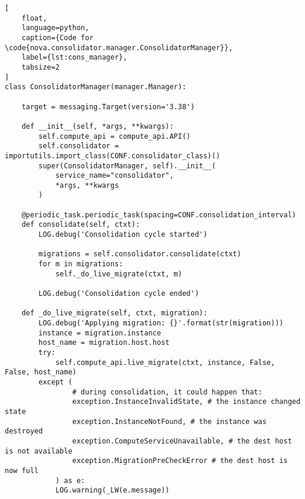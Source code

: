 \begin{lstlisting}[
	float,
	language=python,
	caption={Code for \code{nova.consolidator.manager.ConsolidatorManager}},
	label={lst:cons_manager},
	tabsize=2
]
class ConsolidatorManager(manager.Manager):

	target = messaging.Target(version='3.38')

	def __init__(self, *args, **kwargs):
		self.compute_api = compute_api.API()
		self.consolidator = importutils.import_class(CONF.consolidator_class)()
		super(ConsolidatorManager, self).__init__(
			service_name="consolidator",
			*args, **kwargs
		)

	@periodic_task.periodic_task(spacing=CONF.consolidation_interval)
	def consolidate(self, ctxt):
		LOG.debug('Consolidation cycle started')

		migrations = self.consolidator.consolidate(ctxt)
		for m in migrations:
			self._do_live_migrate(ctxt, m)

		LOG.debug('Consolidation cycle ended')

	def _do_live_migrate(self, ctxt, migration):
		LOG.debug('Applying migration: {}'.format(str(migration)))
		instance = migration.instance
		host_name = migration.host.host
		try:
			self.compute_api.live_migrate(ctxt, instance, False, False, host_name)
		except (
				# during consolidation, it could happen that:
				exception.InstanceInvalidState, # the instance changed state
				exception.InstanceNotFound, # the instance was destroyed
				exception.ComputeServiceUnavailable, # the dest host is not available
				exception.MigrationPreCheckError # the dest host is now full
			) as e:
			LOG.warning(_LW(e.message))
\end{lstlisting}

